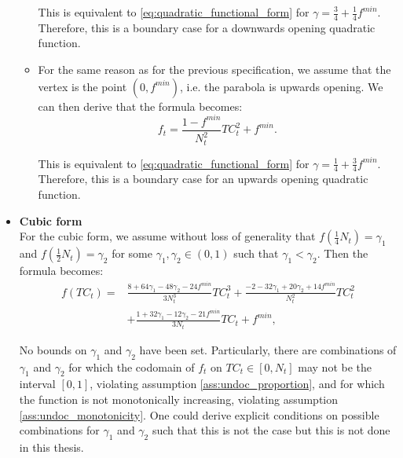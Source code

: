 \documentclass[12pt]{article}
\begin{document}
\begin{itemize}
\begin{itemize}
		        This is equivalent to \eqref{eq:quadratic_functional_form} for $\gamma = \frac{3}{4} + \frac{1}{4} f^{min}$. Therefore, this is a boundary case for a downwards opening quadratic function.
		        
		        \item For the same reason as for the previous specification, we assume that the vertex is the point $(0, f^{min})$, i.e. the parabola is upwards opening. We can then derive that the formula becomes:
		            \begin{equation} \label{eq:quadratic_upwards_functional_form}
		                f_t = \frac{1-f^{min}}{N_t^2}TC_t^2 + f^{min}.
		            \end{equation}
		            
		        This is equivalent to \eqref{eq:quadratic_functional_form} for $\gamma = \frac{1}{4} + \frac{3}{4}f^{min}$. Therefore, this is a boundary case for an upwards opening quadratic function.
		    \end{itemize}
		    
		\item \textbf{Cubic form}\\
		For the cubic form, we assume without loss of generality that $f\left(\frac{1}{4}N_t\right) = \gamma_1$ and $f\left(\frac{1}{2}N_t\right) = \gamma_2$ for some $\gamma_1, \gamma_2 \in (0,1)$ such that $\gamma_1 < \gamma_2$. Then the formula becomes:
		    \begin{equation} \label{eq:cubic_functional_form}
		        \begin{split}
            		f(TC_t) = &\frac{8 + 64\gamma_1 - 48\gamma_2 -24f^{min}}{3N_t^3}TC_t^3 + \frac{-2 - 32\gamma_1 + 20\gamma_2 + 14f^{min}}{N_t^2}TC_t^2 \\
            		&+ \frac{1 + 32\gamma_1 - 12\gamma_2 - 21f^{min}}{3N_t}TC_t + f^{min},
        		\end{split}
		    \end{equation}
		    
	    No bounds on $\gamma_1$ and $\gamma_2$ have been set. Particularly, there are combinations of $\gamma_1$ and $\gamma_2$ for which the codomain of $f_t$ on $TC_t \in [0,N_t]$ may not be the interval $[0,1]$, violating assumption \ref{ass:undoc_proportion}, and for which the function is not monotonically increasing, violating assumption \ref{ass:undoc_monotonicity}. One could derive explicit conditions on possible combinations for $\gamma_1$ and $\gamma_2$ such that this is not the case but this is not done in this thesis.
	\end{itemize}
	
\end{document}
